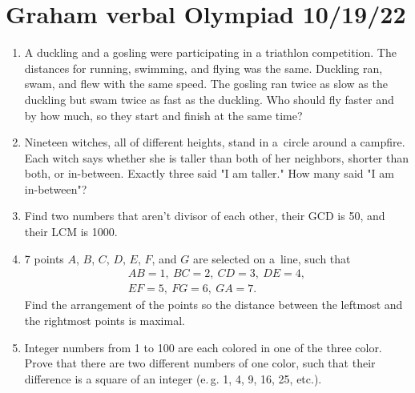 \documentclass[12pt]{article}
\begin{document}
  \pagestyle{empty}
  \section*{Graham verbal Olympiad 10/19/22}
  \begin{enumerate}[leftmargin=6mm]
    \item A duckling and a gosling were participating in a triath\-lon competition. The
    distances for running, swimming, and flying was the same. Duckling ran, swam, and flew with the same speed. The gosling ran twice as slow as the duckling
    but swam twice as fast as the duckling. Who should fly faster and by how much, so they start and finish at the same time?
    
    \item Nineteen witches, all of different heights, stand in a~circle around a campfire.
    Each witch says whether she is taller than both of her neighbors, shorter than both,
    or in-between. Exactly three said "I am taller." How many said "I am in-between"?

    \item Find two numbers that aren't divisor of each other, their GCD is 50, and their LCM is 1000.

    \item 7 points $A$, $B$, $C$, $D$, $E$, $F$, and $G$ are selected on a~line, such that
    \begin{gather*}
      AB = 1,\ BC = 2,\ CD = 3,\ DE = 4,\\ 
      EF = 5,\ FG = 6,\ GA = 7.
    \end{gather*} 
    Find the arrangement of the points so the distance between the leftmost and the rightmost points is maximal.
    
    \item Integer numbers from 1 to 100 are each colored in one of the three color. Prove that there are two different numbers of one color, such that their difference is a square of an integer (e.\,g. 1, 4, 9, 16, 25, etc.).
  \end{enumerate}
  
  \newpage
\end{document}
